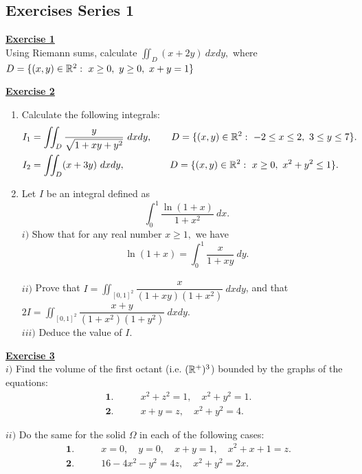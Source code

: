 \subsection{Exercises Series 1}
\vspace*{0.2cm}
\Large{\underline{\textbf{Exercise 1}}}
\normalsize{}\\
\noindent Using Riemann sums, calculate $\displaystyle \iint_D(x + 2y)\ dxdy,$ where $D = \{(x, y)\in \mathbb{R}^2:\ x\geq 0,\ y\geq 0,\ x + y = 1 \}$

\vspace*{0.34cm}
\noindent\Large{\underline{\textbf{Exercise 2}}}
\normalsize{}
\begin{enumerate}
\item Calculate the following integrals:
        \begin{align*}
            &I_1 = \iint_D \dfrac{y}{\sqrt{1 + xy + y^2}}\ dxdy, 
            \qquad D = \{(x, y)\in \mathbb{R}^2:\ -2\leq x \leq 2,\ 3\leq y \leq 7\}\text{.}\\
            &I_2 = \iint_D (x + 3y)\ dxdy, \qquad \qquad \ \ D = \{(x, y)\in \mathbb{R}^2:\ x \geq 0,\ x^2 + y^2 \leq 1\}\text{.}
        \end{align*}
\item Let $I$ be an integral defined as $$\displaystyle \int_0^1 \dfrac{\ln(1 + x)}{1 + x^2}\ dx.$$
        $i)$ Show that for any real number $x \geq 1,$ we have $$\ln (1 + x) = \int_0^1 \dfrac{x}{1 + xy}\ dy.$$\\
        $ii)$ Prove that $\displaystyle I = \iint_{[0, 1]^2} \dfrac{x}{(1 + xy)(1 + x^2)}\ dxdy$, and that
        $\displaystyle 2I = \iint_{[0, 1]^2} \dfrac{x + y}{(1 + x^2)(1 + y^2)}\ dxdy.$\\

        $iii)$ Deduce the value of $I.$
\end{enumerate}

\vspace*{0.34cm}
\noindent\Large{\underline{\textbf{Exercise 3}}}
\normalsize{}\\
\noindent $i)$ Find the volume of the first octant (i.e. $(\mathbb{R}^+)^3$) bounded by the graphs of the equations:
\begin{align*}
    \textbf{1.}& \qquad x^2 + z^2 = 1,\quad x^2 + y^2 = 1.\\
    \textbf{2.}& \qquad x + y = z,\quad x^2 + y^2 = 4.
\end{align*}

\noindent $ii)$ Do the same for the solid $\Omega$ in each of the following cases:
\begin{align*}
    \textbf{1.}& \qquad x = 0,\quad y = 0,\quad x + y = 1,\quad x^2 + x + 1 = z.\\
    \textbf{2.}& \qquad 16 - 4x^2 - y^2 = 4z,\quad x^2 + y^2 = 2x.
\end{align*}

